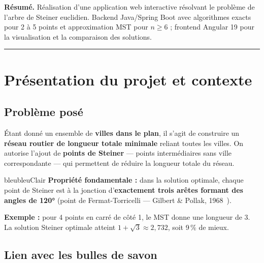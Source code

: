 \documentclass[11pt, a4paper]{article}
\begin{document}
\vspace{1.5em}
\noindent\small{\bfseries Résumé.}\;
Réalisation d'une application web interactive résolvant le problème de l'arbre de Steiner
euclidien. Backend Java/Spring Boot avec algorithmes exacts pour 2 à 5 points et approximation
MST pour $n \geq 6$ ; frontend Angular 19 pour la visualisation et la comparaison des solutions.

\vspace{0.3em}
\noindent\textcolor{bleu}{\rule{\textwidth}{0.5pt}}

\newpage
\thispagestyle{fancy}
{\hypersetup{linkcolor=bleuFonce}\tableofcontents}

\newpage
\section{Présentation du projet et contexte}

\subsection{Problème posé}

Étant donné un ensemble de \textbf{villes dans le plan}, il s'agit de construire un
\textbf{réseau routier de longueur totale minimale} reliant toutes les villes.
On autorise l'ajout de \textbf{points de Steiner} — points intermédiaires sans ville correspondante —
qui permettent de réduire la longueur totale du réseau.

\begin{cadre}{bleu}{bleuClair}
\textbf{Propriété fondamentale :} dans la solution optimale, chaque point de Steiner est
à la jonction d'\textbf{exactement trois arêtes formant des angles de 120°}
(point de Fermat-Torricelli — Gilbert \& Pollak, 1968~\cite{gilbert1968}).
\end{cadre}

\vspace{2pt}
\textbf{Exemple :} pour 4 points en carré de côté 1, le MST donne une longueur de 3.
La solution Steiner optimale atteint $1+\sqrt{3} \approx 2{,}732$, soit 9\,\% de mieux.

\subsection{Lien avec les bulles de savon}
\end{document}
